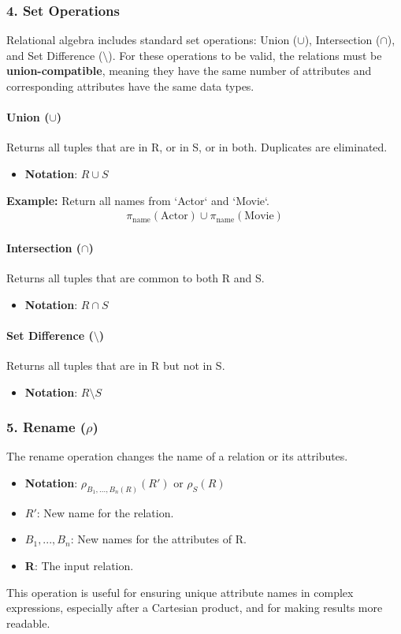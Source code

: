 \documentclass{article}
\newcommand{\proj}{\pi} %
\newcommand{\ren}{\rho} %
\newcommand{\union}{\cup} %
\newcommand{\intersect}{\cap} %
\begin{document}
\subsubsection*{4. Set Operations}
Relational algebra includes standard set operations: Union ($\union$), Intersection ($\intersect$), and Set Difference ($\setminus$). For these operations to be valid, the relations must be \textbf{union-compatible}, meaning they have the same number of attributes and corresponding attributes have the same data types.

\paragraph{Union ($\union$)}
Returns all tuples that are in R, or in S, or in both. Duplicates are eliminated.
\begin{itemize}
    \item \textbf{Notation}: $R \union S$ 
\end{itemize}
\textbf{Example:} Return all names from `Actor` and `Movie`.
\begin{align*}
    \proj_{\text{name}}(\text{Actor}) \union \proj_{\text{name}}(\text{Movie}) \tag{4} \label{eq:union} \text{}
\end{align*}

\paragraph{Intersection ($\intersect$)}
Returns all tuples that are common to both R and S.
\begin{itemize}
    \item \textbf{Notation}: $R \intersect S$ 
\end{itemize}

\paragraph{Set Difference ($\setminus$)}
Returns all tuples that are in R but not in S.
\begin{itemize}
    \item \textbf{Notation}: $R \setminus S$ 
\end{itemize}

\subsubsection*{5. Rename ($\ren$)}
The rename operation changes the name of a relation or its attributes.
\begin{itemize}
    \item \textbf{Notation}: $\ren_{B_1, ..., B_n(R)}(R')$  or $\ren_{S}(R)$ 
    \item \textbf{$R'$}: New name for the relation.
    \item \textbf{$B_1, ..., B_n$}: New names for the attributes of R.
    \item \textbf{R}: The input relation.
\end{itemize}
This operation is useful for ensuring unique attribute names in complex expressions, especially after a Cartesian product, and for making results more readable.
\end{document}
